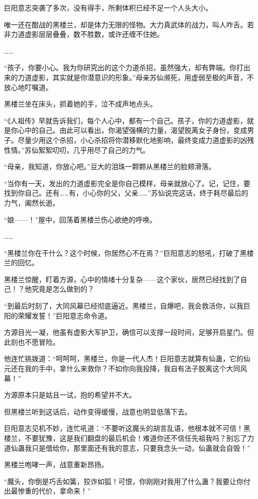 \begin{this_body}
巨阳意志突袭了多次，没有得手，所剩体积已经不足一个人头大小。

唯一还在酣战的黑楼兰，却是体力无限的怪物。大力真武体的战力，叫人咋舌。若非力道虚影层层叠叠，数不胜数，或许还缠不住她。

……

“孩子，你要小心。我为你研究出的这个力道杀招，虽然强大，却有弊端。你打出来的力道虚影，其实就是你潜意识的形象。”母亲苏仙濒死，用虚弱至极的声音，不放心地叮嘱道。

黑楼兰坐在床头，抓着她的手，泣不成声地点头。

“《人祖传》早就告诉我们，每个人心中，都有一个自己。孩子，你的力道虚影，就是你心中的自己。由此可以看出，你渴望强横的力量，渴望脱离女子身份，变成男子。尽量少用这个杀招，小心杀招将你潜移默化地影响，最终变成力道虚影的凶残性情。”苏仙絮絮叨叨，几乎用尽了自己的力气。

“母亲，我知道，你放心吧。”豆大的泪珠一颗颗从黑楼兰的脸颊滑落。

“当你有一天，发出的力道虚影完全是你自己模样，母亲就放心了。记，记住，要找到你自己。还有……有，小心你的父，父亲……”苏仙说完这话，终于耗尽最后的力气，阖然长逝。

“娘——！”屋中，回荡着黑楼兰伤心欲绝的呼唤。

……

“黑楼兰你在干什么？这个时候，你居然心不在焉？”巨阳意志的怒吼，打破了黑楼兰的回忆。

黑楼兰惊醒，盯着方源，心中的情绪十分复杂——这个家伙，居然已经找到了自己！？他究竟是怎么做到的？

“到最后时刻了，大同风幕已经彻底逼近。黑楼兰，自爆吧，我会救活你，以我巨阳的荣耀发誓！”巨阳意志命令道。

方源目光一凝，他虽有虚影大军护卫，确信可以支撑一段时间，足够开启星门。但此刻也不愿冒险。

他连忙挑拨道：“呵呵呵，黑楼兰，你是一代人杰！巨阳意志就算有仙蛊，它的仙元还在我的手中，拿什么来救你？不如你向我投降，我自有法子脱离这个大同风幕！”

方源原本只是姑且一试，抱的希望并不大。

但黑楼兰听到这话后，动作变得缓慢，战意也明显低落下去。

巨阳意志见机不妙，连忙吼道：“不要听这魔头的胡言乱语，他根本就不可信！黑楼兰，不要犹豫，这是我们翻盘的最后机会！难道你还不信任先祖我吗？别忘了力道仙蛊我只是借给你，那里面还有我的意志，只要我念头一动，仙蛊就会自毁！”

黑楼兰咆哮一声，战意重新昂扬。

“魔头，你倒是巧舌如簧，狡诈如狐！可恨，你刚刚对我用了什么蛊？我要让你付出最惨重的代价，拿命来！”


\end{this_body}

